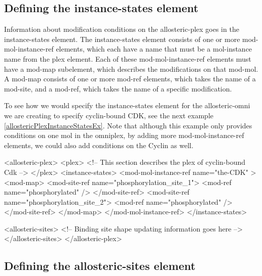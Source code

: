 \subsection{Defining the instance-states element}
Information about modification conditions on the allosteric-plex goes
in the instance-states element.  The instance-states element consists
of one or more mod-mol-instance-ref elements, which each have a name
that must be a mol-instance name from the plex element.  Each of these
mod-mol-instance-ref elements must have a mod-map subelement, which
describes the modifications on that mod-mol.  A mod-map consists of
one or more mod-ref elements, which takes the name of a mod-site, and
a mod-ref, which takes the name of a specific modification.

To see how we would specify the instance-states element for the
allosteric-omni we are creating to specify cyclin-bound CDK, see the
next example \ref{allostericPlexInstanceStatesEx}.  Note that although
this example only provides conditions on one mol in the omniplex, by
adding more mod-mol-instance-ref elements, we could also add
conditions on the Cyclin as well.  

\begin{ExampleXML}[caption=''Giving modification conditions to the allosteric-plex, using the instance-states element'',label=allostericPlexInstanceStatesEx]
<allosteric-plex>
  <plex>
    <!-- This section describes the plex of cyclin-bound Cdk -->
  </plex>
  <instance-states>
    <mod-mol-instance-ref name="the-CDK" >
      <mod-map>
	<mod-site-ref name="phosphorylation_site_1">
	  <mod-ref name="phosphorylated" />
	</mod-site-ref>
	<mod-site-ref name="phosphorylation_site_2">
	  <mod-ref name="phosphorylated" />
	</mod-site-ref>
      </mod-map>
    </mod-mol-instance-ref>
  </instance-states>

  <allosteric-sites>
    <!-- Binding site shape updating information goes here -->
  </allosteric-sites>
</allosteric-plex>
\end{ExampleXML}

\subsection{Defining the allosteric-sites element}

